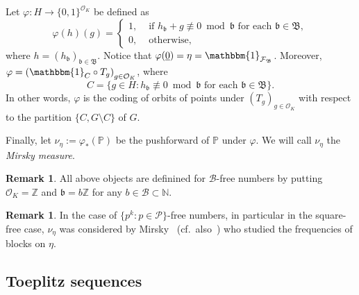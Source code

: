\documentclass[leqno,a4paper,12pt]{article}
\theoremstyle{definition}
\newtheorem{Remark}[Th]{Remark}
\newcommand{\Z}{{\mathbb{Z}}}
\newcommand{\N}{{\mathbb{N}}}
\newcommand{\PP}{{\mathbb{P}}}
\newcommand{\OK}{\mathcal{O}_K}
\newcommand{\sB}{\mathscr{B}}
\newcommand{\raz}{\mathbbm{1}}
\begin{document}
Let $\varphi\colon H\to \{0,1\}^{\mathcal{O}_K}$ be defined as
\begin{equation*}\label{eq:wzor}
\varphi(h)(g)=\begin{cases}
1,& \text{ if }h_{\mathfrak{b}}+g\not\equiv 0\bmod \mathfrak{b} \text{ for each }\mathfrak{b}\in\mathfrak{B},\\
0,&\text{ otherwise},
\end{cases}
\end{equation*}
where $h=(h_\mathfrak{b})_{\mathfrak{b}\in\mathfrak{B}}$. Notice that $\varphi(\underline{0})=\eta=\raz_{\mathcal{F}_\mathfrak{B}}$. Moreover, $\varphi={(\raz_C\circ T_g)}_{g\in\OK}$, where
\begin{equation*}\label{eq:ce}
C=\{g\in H : h_\mathfrak{b}\not\equiv 0 \bmod \mathfrak{b}\text{ for each }\mathfrak{b}\in\mathfrak{B}\}.
\end{equation*}
In other words, $\varphi$ is the coding of orbits of points under ${(T_g)}_{g\in\OK}$ with respect to the partition $\{C,G\setminus C\}$ of $G$.


Finally, let $\nu_\eta:=\varphi_\ast(\PP)$ be the pushforward of $\PP$ under $\varphi$.
We will call $\nu_\eta$ the \emph{Mirsky measure}.
\begin{Remark}
All above objects are definined for $\sB$-free numbers by putting $\OK=\Z$ and $\mathfrak{b}=b\Z$ for any $b\in\sB\subset\N$.
\end{Remark}
\begin{Remark}
In the case of $\{p^k : p\in\mathcal{P}\}$-free numbers, in particular in the square-free case, $\nu_\eta$  was considered by Mirsky~\cite{MR21566,MR28334} (cf.\ also~\cite{MR30561}) who studied the frequencies of blocks on $\eta$.
\end{Remark}
\subsection{Toeplitz sequences}
\end{document}
